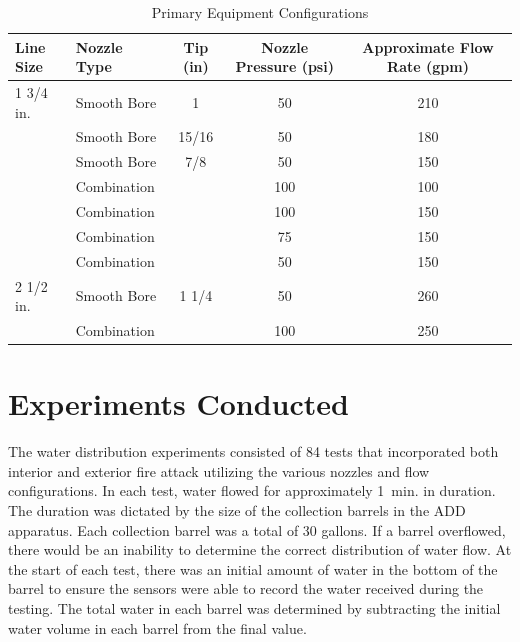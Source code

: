 \documentclass{book}
\begin{document}
\begin{table}[!ht]
\centering
\caption{Primary Equipment Configurations}
\label{tab:nozzles_used_detail}
\begin{tabular}{llccc}
\toprule[1.5pt]
Line Size & Nozzle Type & Tip (in) & Nozzle Pressure (psi) & Approximate Flow Rate (gpm) \\ 
\midrule
1 3/4 in. & Smooth Bore          & 1      & 50 & 210 \\
          & Smooth Bore          & 15/16  & 50 & 180 \\
          & Smooth Bore          & 7/8    & 50 & 150 \\
          & Combination          &        & 100 & 100 \\
          & Combination          &        & 100 & 150 \\
          & Combination          &        & 75 & 150 \\
          & Combination          &        & 50 & 150 \\ \midrule
2 1/2 in. & Smooth Bore          & 1 1/4  & 50 & 260 \\
          & Combination          &        & 100 & 250 \\
\bottomrule[1.25pt]
\end{tabular}
\end{table}

\section{Experiments Conducted}

The water distribution experiments consisted of 84 tests that incorporated both interior and exterior fire attack utilizing the various nozzles and flow configurations. In each test, water flowed for approximately 1~min. in duration. The duration was dictated by the size of the collection barrels in the ADD apparatus. Each collection barrel was a total of 30 gallons. If a barrel overflowed, there would be an inability to determine the correct distribution of water flow. At the start of each test, there was an initial amount of water in the bottom of the barrel to ensure the sensors were able to record the water received during the testing. The total water in each barrel was determined by subtracting the initial water volume in each barrel from the final value. 
\end{document}
